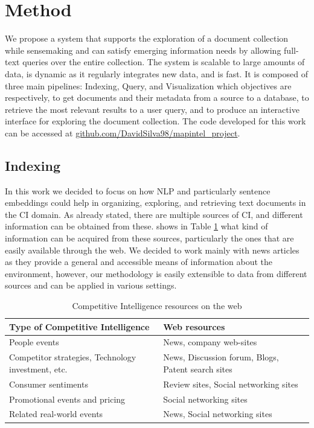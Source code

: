 \documentclass[a4paper]{article}
\begin{document}
\section*{Method}
We propose a system that supports the exploration of a document collection while sensemaking and can satisfy emerging information needs by allowing full-text queries over the entire collection.
The system is scalable to large amounts of data, is dynamic as it regularly integrates new data, and is fast. It is composed of three main pipelines: Indexing, Query, and Visualization which objectives are respectively, to get documents and their metadata from a source to a database, to retrieve the most relevant results to a user query, and to produce an interactive interface for exploring the document collection. The code developed for this work can be accessed at \href{https://github.com/DavidSilva98/mapintel_project}{github.com/DavidSilva98/mapintel\_project}.

\subsection*{Indexing}
In this work we decided to focus on how NLP and particularly sentence embeddings could help in organizing, exploring, and retrieving text documents in the CI domain. As already stated, there are multiple sources of CI, and different information can be obtained from these. \citet{dey2011} shows in Table \ref{ci_resources} what kind of information can be acquired from these sources, particularly the ones that are easily available through the web. We decided to work mainly with news articles as they provide a general and accessible means of information about the environment, however, our methodology is easily extensible to data from different sources and can be applied in various settings. 

\renewcommand{\arraystretch}{1.3}
\begin{table}[h!]
  \begin{center}
    \caption{Competitive Intelligence resources on the web}
    \label{ci_resources}
    \begin{tabular}{ |p{6cm}|p{6cm}| }
	  \hline
      \textbf{Type of Competitive Intelligence} & \textbf{Web resources} \\
      \hline
	  People events & News, company web-sites \\
	  \hline
	  Competitor strategies, Technology investment, etc. & News, Discussion forum, Blogs, Patent search sites \\
	  \hline
	  Consumer sentiments & Review sites, Social networking sites \\
	  \hline
	  Promotional events and pricing & Social networking sites \\
	  \hline
	  Related real-world events & News, Social networking sites \\
	  \hline
    \end{tabular}
  \end{center}
\end{table}
\end{document}
